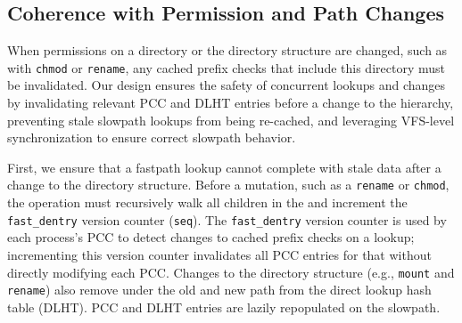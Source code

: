 

\subsection{Coherence with Permission and Path Changes}
\label{sec:dcache:rename}

When permissions on a directory or the directory structure are changed, such as with {\tt chmod} or {\tt rename},
any cached prefix checks that include this directory must be invalidated.
Our design  ensures the safety of concurrent lookups and changes by 
invalidating relevant PCC and DLHT entries before a change to the hierarchy,
preventing stale slowpath lookups from being re-cached, and leveraging VFS-level synchronization
to ensure correct slowpath behavior.
  
First, we ensure that a fastpath lookup cannot complete with stale data after a change to the directory structure.
Before a mutation, such as a {\tt rename} or {\tt chmod}, the operation 
must recursively walk all children in the \dcache{} 
and increment the {\tt fast\_dentry} version counter ({\tt seq}). %
The {\tt fast\_dentry} version counter is used by each process's PCC to detect changes to cached prefix checks on a lookup; %
incrementing this version counter invalidates all PCC entries for that \dentry{} without directly modifying
each PCC.  
Changes to the directory structure (e.g., {\tt mount} and {\tt rename}) 
also remove \dentries{} under the old and new path 
from the direct
lookup hash table (DLHT).
PCC and DLHT entries are lazily repopulated on the slowpath.

